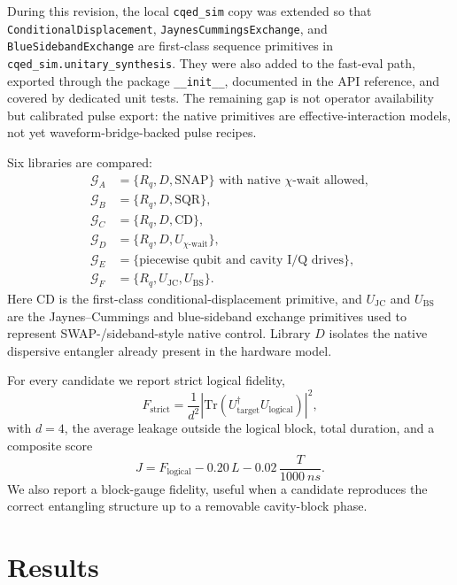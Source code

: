 \documentclass[11pt, a4paper]{article}
\begin{document}
During this revision, the local \texttt{cqed\_sim} copy was extended so that
\texttt{ConditionalDisplacement}, \texttt{JaynesCummingsExchange}, and
\texttt{BlueSidebandExchange} are first-class sequence primitives in
\texttt{cqed\_sim.unitary\_synthesis}. They were also added to the fast-eval
path, exported through the package \texttt{\_\_init\_\_}, documented in the API
reference, and covered by dedicated unit tests. The remaining gap is not
operator availability but calibrated pulse export: the native primitives are
effective-interaction models, not yet waveform-bridge-backed pulse recipes.

Six libraries are compared:
\begin{align}
\mathcal{G}_A &= \{R_q, D, \mathrm{SNAP}\} \text{ with native }\chi\text{-wait allowed}, \\
\mathcal{G}_B &= \{R_q, D, \mathrm{SQR}\}, \\
\mathcal{G}_C &= \{R_q, D, \mathrm{CD}\}, \\
\mathcal{G}_D &= \{R_q, D, U_{\chi\text{-wait}}\}, \\
\mathcal{G}_E &= \{\text{piecewise qubit and cavity I/Q drives}\}, \\
\mathcal{G}_F &= \{R_q, U_{\mathrm{JC}}, U_{\mathrm{BS}}\}.
\end{align}
Here \(\mathrm{CD}\) is the first-class conditional-displacement primitive, and
\(U_{\mathrm{JC}}\) and \(U_{\mathrm{BS}}\) are the Jaynes--Cummings and
blue-sideband exchange primitives used to represent SWAP-/sideband-style native
control. Library \(D\) isolates the native dispersive entangler already present
in the hardware model.

For every candidate we report strict logical fidelity,
\begin{equation}
F_{\mathrm{strict}}
= \frac{1}{d^2} \left|\mathrm{Tr}\left(U_{\mathrm{target}}^\dagger U_{\mathrm{logical}}\right)\right|^2,
\end{equation}
with \(d=4\), the average leakage outside the logical block, total duration, and
a composite score
\begin{equation}
J
=
F_{\mathrm{logical}}
- 0.20\,L
- 0.02\,\frac{T}{\SI{1000}{ns}}.
\end{equation}
We also report a block-gauge fidelity, useful when a candidate reproduces the
correct entangling structure up to a removable cavity-block phase.

\section{Results}
\end{document}
